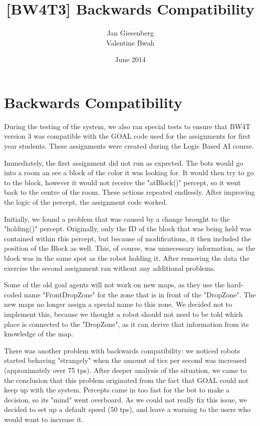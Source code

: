 \documentclass{article}
\title{[BW4T3] Backwards Compatibility}
\author{Jan Giesenberg\\
Valentine Bwah}
\date{June 2014}
\begin{document}
\maketitle

\section{Backwards Compatibility}
During the testing of the system, we also ran special tests to ensure that BW4T version 3 was compatible with the GOAL code used for the assignments for first year students. These assignments were created during the Logic Based AI course. 

Immediately, the first assignment did not run as expected. The bots would go into a room an see a block of the color it was looking for. It would then try to go to the block, however it would not receive the "atBlock()" percept, so it went back to the centre of the room. These actions repeated endlessly. After improving the logic of the percept, the assignment code worked.

Initially, we found a problem that was caused by a change brought to the "holding()" percept. Originally, only the ID of the block that was being held was contained within this percept, but because of modifications, it then included the position of the Block as well. This, of course, was unnecessary information, as the block was in the same spot as the robot holding it. After removing the data the exercise the second assignment ran without any additional problems.

Some of the old goal agents will not work on new maps, as they use the hard-coded name "FrontDropZone" for the zone that is in front of the "DropZone". The new maps no longer assign a special name to this zone. We decided not to implement this, because we thought a robot should not need to be told which place is connected to the "DropZone", as it can derive that information from its knowledge of the map.

There was another problem with backwards compatibility: we noticed robots started behaving "strangely" when the amount of tics per second was increased (approximately over 75 tps). After deeper analysis of the situation, we came to the conclusion that this problem originated from the fact that GOAL could not keep up with the system. Percepts came in too fast for the bot to make a decision, so its "mind" went overboard. As we could not really fix this issue, we decided to set up a default speed (50 tps), and leave a warning to the users who would want to increase it. 
\end{document}
